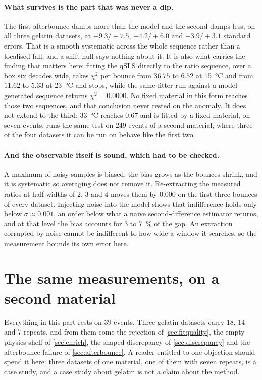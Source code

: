 \documentclass[10pt]{article}
\begin{document}
\paragraph{What survives is the part that was never a dip.} The first afterbounce damps more
than the model and the second damps less, on all three gelatin datasets, at $-9.3/+7.5$,
$-4.2/+6.0$ and $-3.9/+3.1$ standard errors. That is a smooth systematic across the whole
sequence rather than a localised fall, and a shift null says nothing about it. It is also what
carries the finding that matters here: fitting the qSLS directly to the ratio sequence, over a
box six decades wide, takes $\chi^2$ per bounce from $36.75$ to $6.52$ at \SI{15}{\celsius} and
from $11.62$ to $5.33$ at \SI{23}{\celsius} and stops, while the same fitter run against a
model-generated sequence returns $\chi^2 = 0.0000$. No fixed material in this form reaches
those two sequences, and that conclusion never rested on the anomaly. It does not extend to the
third: \SI{33}{\celsius} reaches $0.67$ and is fitted by a fixed material, on seven events.
 runs the same test on $249$ events of a second material, where three of the four
datasets it can be run on behave like the first two.

\paragraph{And the observable itself is sound, which had to be checked.} A maximum of noisy
samples is biased, the bias grows as the bounces shrink, and it is systematic so averaging does
not remove it. Re-extracting the measured ratios at half-widths of $2$, $3$ and $4$ moves them
by $0.000$ on the first three bounces of every dataset. Injecting noise into the model shows
that indifference holds only below $\sigma \approx 0.001$, an order below what a naive
second-difference estimator returns, and at that level the bias accounts for $3$ to
\SI{7}{\percent} of the gap. An extraction corrupted by noise cannot be indifferent to how wide
a window it searches, so the measurement bounds its own error here.

\section{The same measurements, on a second material}
\label{sec:paam}

Everything in this part rests on $39$ events. Three gelatin datasets carry $18$, $14$ and $7$
repeats, and from them come the rejection of \cref{sec:fitquality}, the empty physics shelf of
\cref{sec:enrich}, the shaped discrepancy of \cref{sec:discrepancy} and the afterbounce failure
of \cref{sec:afterbounce}. A reader entitled to one objection should spend it here: three
datasets of one material, one of them with seven repeats, is a case study, and a case study
about gelatin is not a claim about the method.
\end{document}
